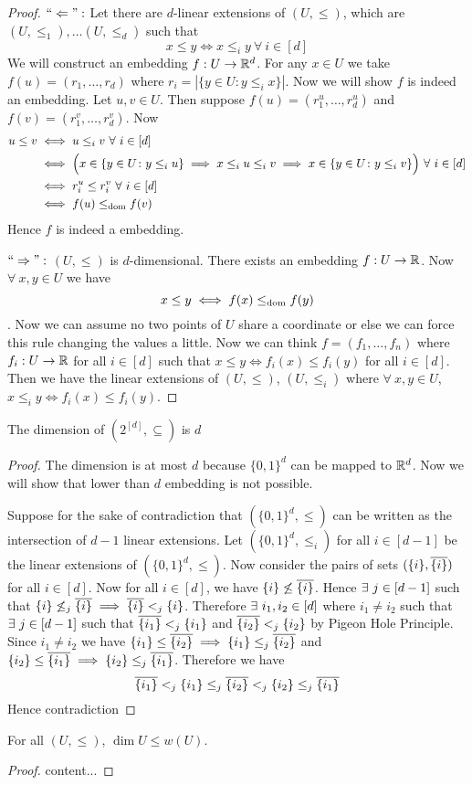 \begin{proof}
	$``\Leftarrow":$ Let there are $d$-linear extensions of $(U,\leq)$, which are $(U,\leq_1),\dots(U,\leq_d)$ such that $$x\leq y\iff x\leq_i y\ \forall\ i\in[d]$$We will construct an embedding $f:U\to \mathbb{R}^d$. For any $x\in U$ we take $f(u)=(r_1,\dots, r_d)$ where $r_i=|\{y\in U\colon y\leq_i x\}|$. Now we will show $f$ is indeed an embedding. Let $u,v\in U$. Then  suppose $f(u)=(r_1^u,\dots,r_d^u)$ and $f(v)=(r_1^v,\dots, r_d^v)$. Now 
	\begin{align*}
		u\leq v&\iff u\leq_i v\ \forall \ i\in[d]\\
		 & \iff \Big(x\in\{y\in U\colon y\leq_i u\}\implies x\leq_i u\leq_i v\implies x\in   \{y\in U\colon y\leq_i v\}  \Big)\ \forall \ i\in[d]\\
		 & \iff r_i^u\leq r_i^v\ \forall \ i\in[d]\\
		 & \iff f(u)\domrel f(v)
	\end{align*}Hence $f$ is indeed a embedding. 

$``\Rightarrow":$ $(U,\leq)$ is $d$-dimensional. There exists an embedding $f:U\to\mathbb{R}$. Now $\forall\ x,y\in U$ we have $$x\leq y\iff f(x)\leq_{\text{dom}} f(y)$$. Now we can assume no two points of $U$ share a coordinate or else we can force this rule changing the values a little. Now we can think $f=(f_1,\dots, f_n)$ where $f_i:U\to \mathbb{R}$ for all $i\in[d]$ such that $x\leq y\iff f_i(x)\leq f_i(y)$ for all $i\in[d]$. Then we have the linear extensions of $(U,\leq)$, $(U,\leq_i)$ where $\forall\ x,y\in U$, $x\leq_i y\iff f_i(x)\leq f_i(y)$.  
\end{proof}
\begin{lemma}{}{}
	The dimension of $(2^{[d]},\subseteq)$ is $d$
\end{lemma}
\begin{proof}
	The dimension is at most $d$ because $\{0,1\}^d$ can be mapped to $\mathbb{R}^d$. Now we will show that  lower than $d$ embedding is not possible. 
	
	Suppose for the sake of contradiction that $(\{0,1\}^d,\leq )$ can be written as the intersection of $d-1$ linear extensions. Let $(\{0,1\}^d,\leq_i)$ for all $i\in[d-1]$ be the linear extensions of $(\{0,1\}^d,\leq)$. Now consider the pairs of sets $(\{i\},\overline{\{i\}})$ for all $i\in[d]$. Now for all $i\in[d]$, we have $\{i\}\not\leq \overline{\{i\}}$. Hence $\exists\ j\in[d-1]$ such that $\{i\}\not\leq_j\overline{\{i\}}\implies \overline{\{i\}}<_j\{i\}$. 	Therefore $\exists\ i_1,i_2\in[d]$ where $i_1\neq i_2$ such that $\exists\ j\in[d-1]$ such that $\overline{\{i_1\}}<_j\{i_1\}$ and $\overline{\{i_2\}}<_j\{i_2\}$ by Pigeon Hole Principle. Since $i_1\neq i_2$ we have $\{i_1\}\leq \overline{\{i_2\}}\implies \{i_1\}\leq_j\overline{\{i_2\}}$ and $\{i_2\}\leq \overline{\{i_1\}}\implies \{i_2\}\leq_j\overline{\{i_1\}}$. Therefore we have $$\overline{\{i_1\}}<_j\{i_1\}\leq_j \overline{\{i_2\}}<_j\{i_2\}\leq_j\overline{\{i_1\}}$$Hence contradiction \ctr
\end{proof}

\begin{lemma}{}{}
	For all $(U,\leq)$, $\dim U\leq w(U)$.
\end{lemma}
\begin{proof}
	content...
\end{proof}